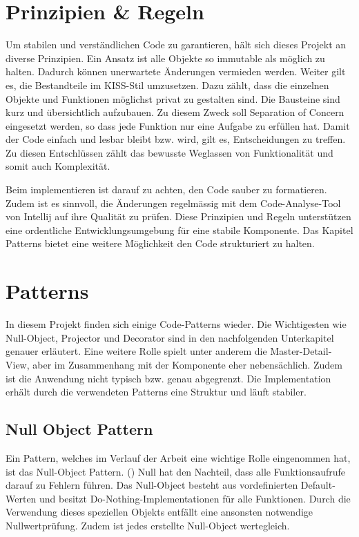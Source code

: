\section{Prinzipien \& Regeln}
\label{sec:principleRules}

Um stabilen und verständlichen Code zu garantieren, hält sich dieses Projekt an diverse Prinzipien.
Ein Ansatz ist alle Objekte so immutable als möglich zu halten.
Dadurch können unerwartete Änderungen vermieden werden.
Weiter gilt es, die Bestandteile im KISS-Stil umzusetzen.
Dazu zählt, dass die einzelnen Objekte und Funktionen möglichst privat zu gestalten sind.
Die Bausteine sind kurz und übersichtlich aufzubauen.
Zu diesem Zweck soll Separation of Concern eingesetzt werden, so dass jede Funktion nur eine Aufgabe zu erfüllen hat.
Damit der Code einfach und lesbar bleibt bzw. wird, gilt es, Entscheidungen zu treffen.
Zu diesen Entschlüssen zählt das bewusste Weglassen von Funktionalität und somit auch Komplexität.

Beim implementieren ist darauf zu achten, den Code sauber zu formatieren.
Zudem ist es sinnvoll, die Änderungen regelmässig mit dem Code-Analyse-Tool von Intellij auf ihre Qualität zu prüfen. 
Diese Prinzipien und Regeln unterstützen eine ordentliche Entwicklungsumgebung für eine stabile Komponente.
Das Kapitel Patterns bietet eine weitere Möglichkeit den Code strukturiert zu halten.


\section{Patterns}
\label{sec:patterns}

In diesem Projekt finden sich einige Code-Patterns wieder.
Die Wichtigesten wie Null-Object, Projector und Decorator sind in den nachfolgenden Unterkapitel genauer erläutert.
Eine weitere Rolle spielt unter anderem die Master-Detail-View, aber im Zusammenhang mit der Komponente eher nebensächlich.
Zudem ist die Anwendung nicht typisch bzw. genau abgegrenzt.
Die Implementation erhält durch die verwendeten Patterns eine Struktur und läuft stabiler.


\subsection{Null Object Pattern}
\label{sec:nullPattern}

Ein Pattern, welches im Verlauf der Arbeit eine wichtige Rolle eingenommen hat, ist das Null-Object Pattern.
(\cite{nullObjectPattern}) Null hat den Nachteil, dass alle Funktionsaufrufe darauf zu Fehlern führen.
Das Null-Object besteht aus vordefinierten Default-Werten und besitzt Do-Nothing-Implementationen für alle Funktionen.
Durch die Verwendung dieses speziellen Objekts entfällt eine ansonsten notwendige Nullwertprüfung.
Zudem ist jedes erstellte Null-Object wertegleich.

